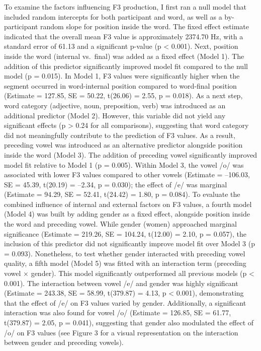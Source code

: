 \documentclass[
  man]{apa6}
\begin{document}
To examine the factors influencing F3 production, I first ran a null model that included random intercepts for both participant and word, as well as a by-participant random slope for position inside the word. The fixed effect estimate indicated that the overall mean F3 value is approximately 2374.70 Hz, with a standard error of 61.13 and a significant p-value (p \textless{} 0.001).
Next, position inside the word (internal vs.~final) was added as a fixed effect (Model 1). The addition of this predictor significantly improved model fit compared to the null model (p = 0.015). In Model 1, F3 values were significantly higher when the segment occurred in word-internal position compared to word-final position (Estimate = 127.85, SE = 50.22, t(26.06) = 2.55, p = 0.018).
As a next step, word category (adjective, noun, preposition, verb) was introduced as an additional predictor (Model 2). However, this variable did not yield any significant effects (p \textgreater{} 0.24 for all comparisons), suggesting that word category did not meaningfully contribute to the prediction of F3 values.
As a result, preceding vowel was introduced as an alternative predictor alongside position inside the word (Model 3). The addition of preceding vowel significantly improved model fit relative to Model 1 (p = 0.005). Within Model 3, the vowel /o/ was associated with lower F3 values compared to other vowels (Estimate = --106.03, SE = 45.39, t(20.19) = --2.34, p = 0.030); the effect of /e/ was marginal (Estimate = 94.29, SE = 52.41, t(24.42) = 1.80, p = 0.084).
To evaluate the combined influence of internal and external factors on F3 values, a fourth model (Model 4) was built by adding gender as a fixed effect, alongside position inside the word and preceding vowel. While gender (women) approached marginal significance (Estimate = 219.26, SE = 104.24, t(12.00) = 2.10, p = 0.057), the inclusion of this predictor did not significantly improve model fit over Model 3 (p = 0.093). Nonetheless, to test whether gender interacted with preceding vowel quality, a fifth model (Model 5) was fitted with an interaction term (preceding vowel × gender). This model significantly outperformed all previous models (p \textless{} 0.001). The interaction between vowel /e/ and gender was highly significant (Estimate = 243.38, SE = 58.99, t(379.87) = 4.13, p \textless{} 0.001), demonstrating that the effect of /e/ on F3 values varied by gender. Additionally, a significant interaction was also found for vowel /o/ (Estimate = 126.85, SE = 61.77, t(379.87) = 2.05, p = 0.041), suggesting that gender also modulated the effect of /o/ on F3 values (see Figure 3 for a visual representation on the interaction between gender and preceding vowels).
\end{document}
